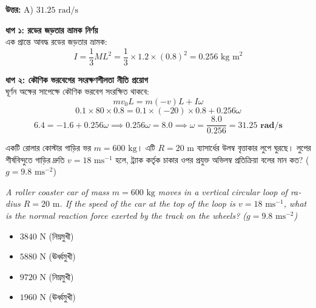 \documentclass[12pt, a4paper]{article}
\begin{document}
{\begin{tcolorbox}[answerbox]
\textbf{\color{success} উত্তর:} A) $31.25\text{ rad/s}$
\end{tcolorbox}
\vspace{1em}

\begin{tcolorbox}[solutionbox={সমাধান (Solution)}]
\noindent
\textbf{ধাপ ১: রডের জড়তার ভ্রামক নির্ণয়} \\
এক প্রান্তে আবদ্ধ রডের জড়তার ভ্রামক:
\[I = \frac{1}{3} M L^2 = \frac{1}{3} \times 1.2 \times (0.8)^2 = 0.256\text{ kg m}^2\]

\vspace{0.5em}
\noindent\textbf{ধাপ ২: কৌণিক ভরবেগের সংরক্ষণশীলতা নীতি প্রয়োগ} \\
ঘূর্ণন অক্ষের সাপেক্ষে কৌণিক ভরবেগ সংরক্ষিত থাকবে:
\[m v_0 L = m (-v) L + I \omega\]
\[0.1 \times 80 \times 0.8 = 0.1 \times (-20) \times 0.8 + 0.256 \omega\]
\[6.4 = -1.6 + 0.256 \omega \implies 0.256 \omega = 8.0 \implies \omega = \frac{8.0}{0.256} = \mathbf{31.25\text{ rad/s}}\]
\end{tcolorbox}

\vspace{2em}

\begin{tcolorbox}[questionbox={প্রশ্ন (Question) 39}]
\noindent
একটি রোলার কোস্টার গাড়ির ভর $m = 600\text{ kg}$। এটি $R = 20\text{ m}$ ব্যাসার্ধের উলম্ব বৃত্তাকার লুপে ঘুরছে। লুপের শীর্ষবিন্দুতে গাড়ির দ্রুতি $v = 18\text{ ms}^{-1}$ হলে, ট্র্যাক কর্তৃক চাকার ওপর প্রযুক্ত অভিলম্ব প্রতিক্রিয়া বলের মান কত? ($g = 9.8\text{ ms}^{-2}$)
\vspace{0.8em}
\begin{english}
\noindent\textit{\color{darkgray}
A roller coaster car of mass $m = 600\text{ kg}$ moves in a vertical circular loop of radius $R = 20\text{ m}$. If the speed of the car at the top of the loop is $v = 18\text{ ms}^{-1}$, what is the normal reaction force exerted by the track on the wheels? ($g = 9.8\text{ ms}^{-2}$)
}
\end{english}
\end{tcolorbox}

\begin{itemize}[label={}, leftmargin=1cm, itemsep=0.5em]
\item[\textbf{A)}] $3840\text{ N}$ (নিম্নমুখী)
\item[\textbf{B)}] $5880\text{ N}$ (ঊর্ধ্বমুখী)
\item[\textbf{C)}] $9720\text{ N}$ (নিম্নমুখী)
\item[\textbf{D)}] $1960\text{ N}$ (ঊর্ধ্বমুখী)
\end{itemize}
\vspace{0.5em}

}
\end{document}
